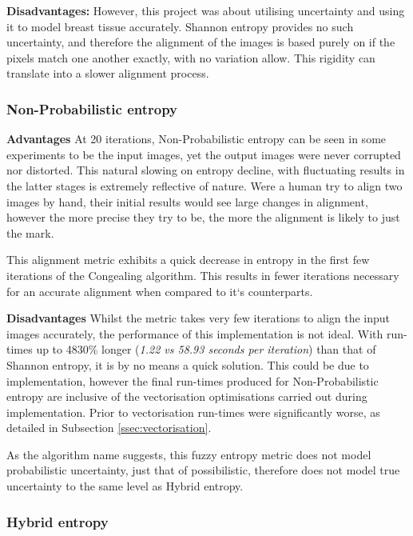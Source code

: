 \textbf{Disadvantages: }
However, this project was about utilising uncertainty and using it to model breast tissue accurately. Shannon entropy provides no such uncertainty, and therefore the alignment of the images is based purely on if the pixels match one another exactly, with no variation allow. This rigidity can translate into a slower alignment process.

\subsubsection{Non-Probabilistic entropy}

\textbf{Advantages}
At 20 iterations, Non-Probabilistic entropy can be seen in some experiments to be  the input images, yet the output images were never corrupted nor distorted. This natural slowing on entropy decline, with fluctuating results in the latter stages is extremely reflective of nature. Were a human try to align two images by hand, their initial results would see large changes in alignment, however the more precise they try to be, the more the alignment is likely to just  the mark.

This alignment metric exhibits a quick decrease in entropy in the first few iterations of the \Gls{Congealing} algorithm. This results in fewer iterations necessary for an accurate alignment when compared to it`s counterparts.

\textbf{Disadvantages}
Whilst the metric takes very few iterations to align the input images accurately, the performance of this implementation is not ideal. With run-times up to 4830\% longer (\textit{1.22 vs 58.93 seconds per iteration}) than that of Shannon entropy, it is by no means a quick solution. This could be due to implementation, however the final run-times produced for Non-Probabilistic entropy are inclusive of the vectorisation optimisations carried out during implementation. Prior to vectorisation run-times were significantly worse, as detailed in Subsection \ref{ssec:vectorisation}.

As the algorithm name suggests, this fuzzy entropy metric does not model probabilistic uncertainty, just that of possibilistic, therefore does not model true uncertainty to the same level as Hybrid entropy.

\subsubsection{Hybrid entropy}


